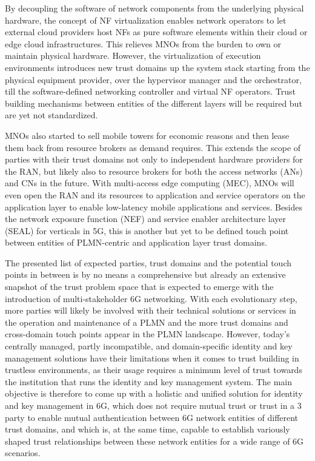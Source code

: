 \documentclass[conference]{IEEEtran}
\begin{document}
By decoupling the software of network components from the underlying physical hardware, the concept of NF virtualization enables network operators to let external cloud providers host NFs as pure software elements within their cloud or edge cloud infrastructures. This relieves MNOs from the burden to own or maintain physical hardware. However, the virtualization of execution environments introduces new trust domains up the system stack starting from the physical equipment provider, over the hypervisor manager and the orchestrator, till the software-defined networking controller and virtual NF operators. Trust building mechanisms between entities of the different layers will be required but are yet not standardized.                

MNOs also started to sell mobile towers for economic reasons and then lease them back from resource brokers as demand requires. This extends the scope of parties with their trust domains not only to independent hardware providers for the RAN, but likely also to resource brokers for both the access networks (ANs) and CNs in the future. With multi-access edge computing (MEC), MNOs will even open the RAN and its resources to application and service operators on the application layer to enable low-latency mobile applications and services. Besides the network exposure function (NEF) and service enabler architecture layer (SEAL) for verticals in 5G, this is another but yet to be defined touch point between entities of PLMN-centric and application layer trust domains. 

The presented list of expected parties, trust domains and the potential touch points in between is by no means a comprehensive but already an extensive snapshot of the trust problem space that is expected to emerge with the introduction of multi-stakeholder 6G networking. With each evolutionary step, more parties will likely be involved with their technical solutions or services in the operation and maintenance of a PLMN and the more trust domains and cross-domain touch points appear in the PLMN landscape. However, today's centrally managed, partly incompatible, and domain-specific identity and key management solutions have their limitations when it comes to trust building in trustless environments, as their usage requires a minimum level of trust towards the institution that runs the identity and key management system. The main objective is therefore to come up with a holistic and unified solution for identity and key management in 6G, which does not require mutual trust or trust in a 3 party to enable mutual authentication between 6G network entities of different trust domains, and which is, at the same time, capable to establish variously shaped trust relationships between these network entities for a wide range of 6G scenarios.
\end{document}
